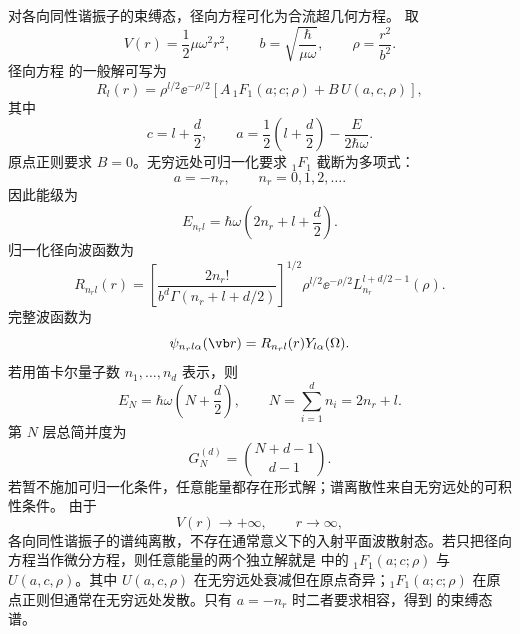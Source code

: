 对各向同性谐振子的束缚态，径向方程可化为合流超几何方程。
取
\begin{equation}
	V(r)=\frac12\mu\omega^2r^2,\qquad
	b=\sqrt{\frac{\hbar}{\mu\omega}},\qquad
	\rho=\frac{r^2}{b^2}.
\end{equation}
径向方程  的一般解可写为
\begin{equation}
	R_l(r)=\rho^{l/2}\ee^{-\rho/2}
	\left[
		A\,{}_1F_1(a;c;\rho)+B\,U(a,c,\rho)
	\right],
	\label{eq:phys-hdqm-osc-general-solution}
\end{equation}
其中
\begin{equation}
	c=l+\frac{d}{2},\qquad
	a=\frac12\left(l+\frac{d}{2}\right)-\frac{E}{2\hbar\omega}.
\end{equation}
原点正则要求 \(B=0\)。无穷远处可归一化要求
\({}_1F_1\) 截断为多项式：
\begin{equation}
	a=-n_r,\qquad n_r=0,1,2,\ldots.
\end{equation}
因此能级为
\begin{equation}
	E_{n_rl}=\hbar\omega\left(2n_r+l+\frac{d}{2}\right).
	\label{eq:phys-hdqm-osc-energy}
\end{equation}
归一化径向波函数为
\begin{equation}
	R_{n_rl}(r)=
	\left[\frac{2n_r!}{b^d\Gamma(n_r+l+d/2)}\right]^{1/2}
	\rho^{l/2}\ee^{-\rho/2}L_{n_r}^{l+d/2-1}(\rho).
	\label{eq:phys-hdqm-osc-bound}
\end{equation}
完整波函数为
\begin{equation}
	\psi_{n_rl\alpha}(\vb r)=R_{n_rl}(r)Y_{l\alpha}(\Omega).
\end{equation}
若用笛卡尔量子数 \(n_1,\ldots,n_d\) 表示，则
\begin{equation}
	E_N=\hbar\omega\left(N+\frac{d}{2}\right),\qquad
	N=\sum_{i=1}^d n_i=2n_r+l.
\end{equation}
第 \(N\) 层总简并度为
\begin{equation}
	G_N^{(d)}=\binom{N+d-1}{d-1}.
\end{equation}
若暂不施加可归一化条件，任意能量都存在形式解；谱离散性来自无穷远处的可积性条件。
由于
\begin{equation}
	V(r)\to+\infty,\qquad r\to\infty,
\end{equation}
各向同性谐振子的谱纯离散，不存在通常意义下的入射平面波散射态。若只把径向方程当作微分方程，则任意能量的两个独立解就是 中的
\({}_1F_1(a;c;\rho)\) 与 \(U(a,c,\rho)\)。其中 \(U(a,c,\rho)\) 在无穷远处衰减但在原点奇异；\({}_1F_1(a;c;\rho)\) 在原点正则但通常在无穷远处发散。只有 \(a=-n_r\) 时二者要求相容，得到 的束缚态谱。

